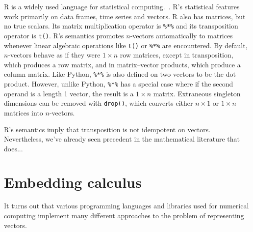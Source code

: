 R is a widely used language for statistical computing.~\cite{Rlang}.
R's statistical features work primarily on data frames, time series and vectors.
R also has matrices, but no true scalars.
Its matrix multiplication operator is \verb`%*%` and its transposition operator
is \verb`t()`.
R's semantics promotes $n$-vectors automatically to matrices whenever linear algebraic
operations like \verb`t()` or \verb`%*%` are encountered.
By default, $n$-vectors behave as if they were $1\times n$ row matrices, except in
transposition, which produces a row matrix, and in matrix--vector products, which
produce a column matrix.
Like Python, \verb`%*%` is also defined on two vectors to be the dot product.
However, unlike Python, \verb`%*%` has a special case where if the second operand
is a length 1 vector, the result is a $1\times n$ matrix.
Extraneous singleton dimensions can be removed with \verb`drop()`, which converts
either $n\times1$ or $1\times n$ matrices into $n$-vectors.

R's semantics imply that transposition is not idempotent on vectors.
Nevertheless, we've already seen precedent in the mathematical literature
that does...

\section{Embedding calculus}

It turns out that various programming languages and libraries used
for numerical computing implement many different approaches to the
problem of representing vectors.

